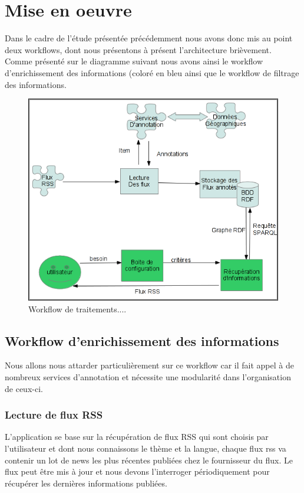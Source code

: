 \documentclass[]{easychair}
\begin{document}
\section{Mise en oeuvre}
\label{sect:miseEnOuvre}
Dans le cadre de l'étude présentée précédemment nous avons donc mis au point deux workflows, dont nous présentons à présent l'architecture brièvement. Comme présenté sur le diagramme suivant nous avons ainsi le workflow d'enrichissement des informations (coloré en bleu ainsi que le workflow de filtrage des informations.

\begin{figure}[htb!]
	\begin{centering}
	\includegraphics[width=1\textwidth]{diagramme-Archi.png}
	\caption{Workflow de traitements....}
	\label{fig:mmFM}
	\end{centering}
\end{figure}

\subsection{Workflow d'enrichissement des informations}
Nous allons nous attarder particulièrement sur ce workflow car il fait appel à de nombreux services d'annotation et nécessite une modularité dans l'organisation de ceux-ci.

\subsubsection{Lecture de flux RSS}
L'application se base sur la récupération de flux RSS qui sont choisis par l'utilisateur et dont nous connaissons le thème et la langue, chaque flux rss va contenir un lot de news les plus récentes publiées chez le fournisseur du flux. Le flux peut être mis à jour et nous devons l'interroger périodiquement pour récupérer les dernières informations publiées.
\end{document}
